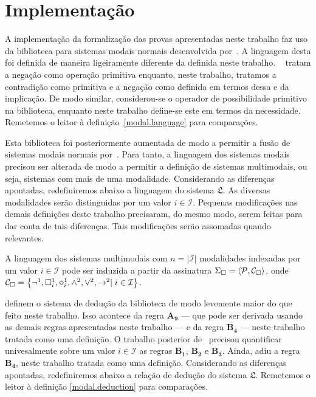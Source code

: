 \chapter{Implementação} 

A implementação da formalização das provas apresentadas neste trabalho faz uso da biblioteca para sistemas modais normais desenvolvida por~\cite{Silveira}.
A linguagem desta foi definida de maneira ligeiramente diferente da definida neste trabalho.
~\cite{Silveira} tratam a negação como operação primitiva enquanto, neste trabalho, tratamos a contradição como primitiva e a negação como definida em termos dessa e da implicação.
De modo similar, considerou-se o operador de possibilidade primitivo na biblioteca, enquanto neste trabalho define-se este em termos da necessidade.
Remetemos o leitor à definição~\ref{modal.language} para comparações.

\vspace{0.5\baselineskip}
Esta biblioteca foi posteriormente aumentada de modo a permitir a fusão de sistemas modais normais por~\cite{Nunes}.
Para tanto, a linguagem dos sistemas modais precisou ser alterada de modo a permitir a definição de sistemas multimodais, ou seja, sistemas com mais de uma modalidade.
Considerando as diferenças apontadas, redefiniremos abaixo a linguagem do sistema $\mathfrak{L}$.
As diversas modalidades serão distinguidas por um valor $i\in\mathcal{I}$.
Pequenas modificações nas demais definições deste trabalho precisaram, do mesmo modo, serem feitas para dar conta de tais diferenças.
Tais modificações serão assomadas quando relevantes.

\vspace{0.5\baselineskip}
\begin{tcolorbox}[enhanced jigsaw, breakable, sharp corners, colframe=black, colback=white, boxrule=0.5pt, left=1.5mm, right=1.5mm, top=1.5mm, bottom=1.5mm]
\begin{definition}
    A linguagem dos sistemas multimodais com $n=|\mathcal{I}|$ modalidades indexadas por um valor $i\in\mathcal{I}$ pode ser induzida a partir da assinatura $\Sigma_{\Box}=\langle\mathcal{P},\mathcal{C}_{\Box}\rangle$, onde $\mathcal{C}_{\nec}=\set{\neg^1,\nec^1_i,\pos^1_i,\wedge^2,\vee^2,\to^2\mid i\in\mathcal{I}}$.
\end{definition}
\end{tcolorbox}

\vspace{0.5\baselineskip}
\cite{Silveira} definem o sistema de dedução da biblioteca de modo levemente maior do que feito neste trabalho.
Isso acontece da regra $\mathbf{A_9}$ --- que pode ser derivada usando as demais regras apresentadas neste trabalho --- e da regra $\mathbf{B_4}$ --- neste trabalho tratada como uma definição.
O trabalho posterior de~\cite{Nunes} precisou quantificar univesalmente sobre um valor $i\in\mathcal{I}$ as regras $\mathbf{B_1}$, $\mathbf{B_2}$ e $\mathbf{B_3}$.
Ainda, adiu a regra $\mathbf{B_4}$, neste trabalho tratada como uma definição.
Considerando as diferenças apontadas, redefiniremos abaixo a relação de dedução do sistema $\mathfrak{L}$.
Remetemos o leitor à definição \ref{modal.deduction} para comparações.

